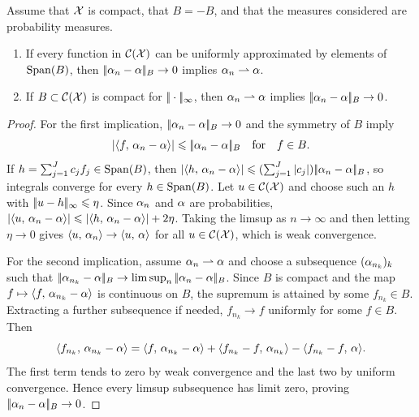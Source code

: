\begin{prop}\label{prop-dual-norm-metrization}
	Assume that $\mathcal{X}$ is compact, that $B=-B$, and that the measures considered are probability measures.
	\begin{enumerate}
		\item If every function in $\mathcal{C}(\mathcal{X})$ can be uniformly approximated by elements of $\operatorname{Span}(B)$, then $|\!| \alpha_n-\alpha |\!|_B \rightarrow 0$ implies $\alpha_n \rightharpoonup \alpha$.
		\item If $B \subset \mathcal{C}(\mathcal{X})$ is compact for $|\!| \cdot |\!|_\infty$, then $\alpha_n \rightharpoonup \alpha$ implies $|\!| \alpha_n-\alpha |\!|_B \rightarrow 0$.
	\end{enumerate}
\end{prop}
\begin{proof}
	For the first implication, $|\!| \alpha_n-\alpha |\!|_B\to0$ and the symmetry of $B$ imply
	\[
		\left\lvert\langle f,\,\alpha_n-\alpha\rangle\right\rvert\leqslant |\!| \alpha_n-\alpha |\!|_B
		\quad \text{for} \quad f\in B.
	\]
	If $h=\sum_{j=1}^J c_j f_j\in\operatorname{Span}(B)$, then
	$\left\lvert\langle h,\,\alpha_n-\alpha\rangle\right\rvert
	\leqslant(\sum_{j=1}^J|c_j|)|\!| \alpha_n-\alpha |\!|_B$,
	so integrals converge for every $h\in\operatorname{Span}(B)$. Let $u\in\mathcal{C}(\mathcal{X})$ and choose such an $h$ with $|\!| u-h |\!|_\infty\leqslant\eta$. Since $\alpha_n$ and $\alpha$ are probabilities,
	$\left\lvert\langle u,\,\alpha_n-\alpha\rangle\right\rvert
	\leqslant\left\lvert\langle h,\,\alpha_n-\alpha\rangle\right\rvert+2\eta$.
	Taking the limsup as $n\to\infty$ and then letting $\eta\to0$ gives $\langle u,\,\alpha_n\rangle\to\langle u,\,\alpha\rangle$ for all $u\in\mathcal{C}(\mathcal{X})$, which is weak convergence.

	For the second implication, assume $\alpha_n\rightharpoonup\alpha$ and choose a subsequence $(\alpha_{n_k})_k$ such that $|\!| \alpha_{n_k}-\alpha |\!|_B\to\limsup_n|\!| \alpha_n-\alpha |\!|_B$. Since $B$ is compact and the map $f\mapsto\langle f,\,\alpha_{n_k}-\alpha\rangle$ is continuous on $B$, the supremum is attained by some $f_{n_k}\in B$. Extracting a further subsequence if needed, $f_{n_k}\to f$ uniformly for some $f\in B$. Then
	\[
		\langle f_{n_k},\,\alpha_{n_k}-\alpha\rangle
		=
		\langle f,\,\alpha_{n_k}-\alpha\rangle
		+\langle f_{n_k}-f,\,\alpha_{n_k}\rangle
		-\langle f_{n_k}-f,\,\alpha\rangle.
	\]
	The first term tends to zero by weak convergence and the last two by uniform convergence. Hence every limsup subsequence has limit zero, proving $|\!| \alpha_n-\alpha |\!|_B\to0$.
\end{proof}

